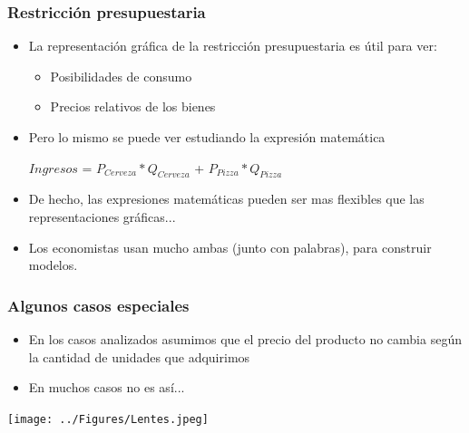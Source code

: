 \documentclass{beamer}
\begin{document}
\begin{frame}
\frametitle{Restricción presupuestaria}
\begin{itemize}
    \item La representación gráfica de la restricción presupuestaria es útil para ver:
    \begin{itemize}
        \item Posibilidades de consumo
        \item Precios relativos de los bienes
    \end{itemize}
    \item Pero lo mismo se puede ver estudiando la expresión matemática \\ \vspace{2mm}
    \begin{center}
    $Ingresos$ = $P_{Cerveza} * Q_{Cerveza}$ + $P_{Pizza} * Q_{Pizza}$
    \\
    \end{center}\vspace{2mm}
    \item De hecho, las expresiones matemáticas pueden ser mas flexibles que las representaciones gráficas...
    \item Los economistas usan mucho ambas (junto con palabras), para construir modelos.
\end{itemize} 
\end{frame}

\begin{frame}
\frametitle{Algunos casos especiales}
\begin{itemize}
\item En los casos analizados asumimos que el precio del producto no cambia según la cantidad de unidades que adquirimos
\item En muchos casos no es así...
\end{itemize}
\vspace{3mm}
\centering
\texttt{[image: ../Figures/Lentes.jpeg]}
\end{frame}
\end{document}

